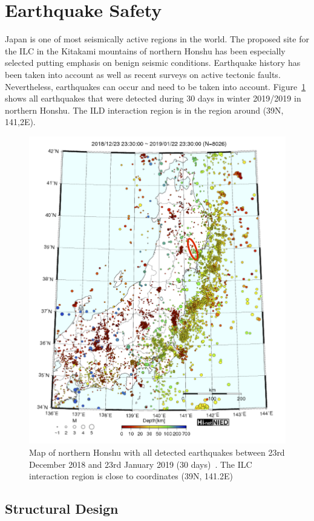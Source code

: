 \section{Earthquake Safety}
Japan is one of most seismically active regions in the world. The proposed site for the ILC in the Kitakami mountains of northern Honshu has been especially selected putting emphasis on benign seismic conditions. Earthquake history has been taken into account as well as recent surveys on active tectonic faults. Nevertheless, earthquakes can occur and need to be taken into account. Figure~\ref{ild:fig:integration:earthquake_map} shows all earthquakes that were detected during 30 days in winter 2019/2019 in northern Honshu. The ILD interaction region is in the region around (39N, 141,2E).

\begin{figure}[h!]
\centering
\includegraphics[width=0.8\hsize]{Integration/fig/earthquake_map.png}

\caption{\label{ild:fig:integration:earthquake_map}Map of northern Honshu with all detected earthquakes between 23rd December 2018 and 23rd January 2019 (30 days)~\cite{ild:bib:hi-net}. The ILC interaction region is close to coordinates (39N, 141.2E)}
\end{figure}

\subsection{Structural Design}


